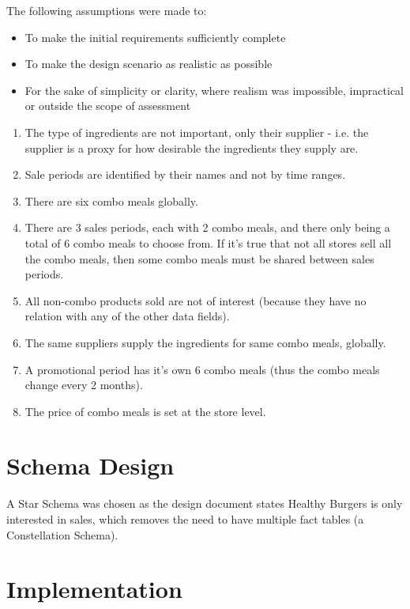 \documentclass[12pt, a4paper]{article}
\begin{document}
The following assumptions were made to:

\begin{itemize}
	\item To make the initial requirements \cite{designdoc} sufficiently complete
	\item To make the design scenario as realistic as possible 
	\item For the sake of simplicity or clarity, where realism was impossible, impractical or outside the scope of assessment
\end{itemize}

\begin{enumerate}
	\item The type of ingredients are not important, only their supplier - i.e. the supplier is a proxy for how desirable the ingredients they supply are. 
	\item Sale periods are identified by their names and not by time ranges.
	\item There are six combo meals globally.
	\item There are 3 sales periods, each with 2 combo meals, and there only being a total of 6 combo meals to choose from. If it’s true that not all stores sell all the combo meals, then some combo meals must be shared between sales periods.
	\item All non-combo products sold are not of interest (because they have no relation with any of the other data fields).
	\item The same suppliers supply the ingredients for same combo meals, globally.
	\item A promotional period has it’s own 6 combo meals (thus the combo meals change every 2 months).
	\item The price of combo meals is set at the store level.
\end{enumerate}

\section*{Schema Design}

A Star Schema was chosen as the design document \cite{designdoc} states Healthy Burgers is only interested in sales, which removes the need to have multiple fact tables (a Constellation Schema). 

\section*{Implementation}
\end{document}
